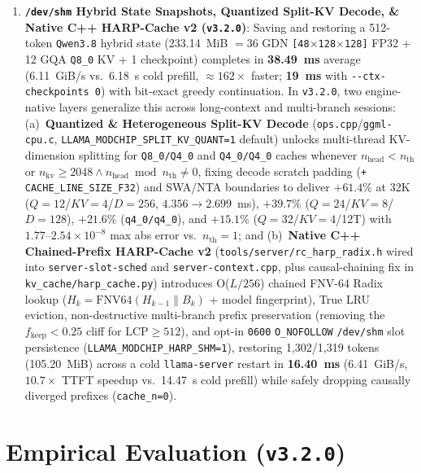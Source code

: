 \documentclass[10pt,twocolumn]{article}
\begin{document}
\begin{enumerate}
    \item \textbf{\texttt{/dev/shm} Hybrid State Snapshots, Quantized Split-KV Decode, \& Native C++ HARP-Cache v2 (\texttt{v3.2.0})}: Saving and restoring a 512-token \texttt{Qwen3.8} hybrid state (233.14~MiB $= 36$ GDN \texttt{[48$\times$128$\times$128]} FP32 + 12 GQA \texttt{Q8\_0} KV + 1 checkpoint) completes in \textbf{38.49~ms} average (6.11~GiB/s vs.\ 6.18~s cold prefill, ${\approx}162\times$ faster; \textbf{19~ms} with \texttt{{-}{-}ctx-checkpoints 0}) with bit-exact greedy continuation. In \texttt{v3.2.0}, two engine-native layers generalize this across long-context and multi-branch sessions: (a)~\textbf{Quantized \& Heterogeneous Split-KV Decode} (\texttt{ops.cpp}/\texttt{ggml-cpu.c}, \texttt{LLAMA\_MODCHIP\_SPLIT\_KV\_QUANT=1} default) unlocks multi-thread KV-dimension splitting for \texttt{Q8\_0/Q4\_0} and \texttt{Q4\_0/Q4\_0} caches whenever $n_{\text{head}} < n_{\text{th}}$ or $n_{\text{kv}} \ge 2048 \land n_{\text{head}} \bmod n_{\text{th}} \ne 0$, fixing decode scratch padding (\texttt{+ CACHE\_LINE\_SIZE\_F32}) and SWA/NTA boundaries to deliver \textbf{$+61.4\%$} at 32K ($Q{=}12$/$KV{=}4$/$D{=}256$, $4.356 \to 2.699$~ms), \textbf{$+39.7\%$} ($Q{=}24$/$KV{=}8$/$D{=}128$), \textbf{$+21.6\%$} (\texttt{q4\_0/q4\_0}), and \textbf{$+15.1\%$} ($Q{=}32$/$KV{=}4$/12T) with $1.77$--$2.54 \times 10^{-8}$ max abs error vs.\ $n_{\text{th}}{=}1$; and (b)~\textbf{Native C++ Chained-Prefix HARP-Cache v2} (\texttt{tools/server/rc\_harp\_radix.h} wired into \texttt{server-slot-sched} and \texttt{server-context.cpp}, plus causal-chaining fix in \texttt{kv\_cache/harp\_cache.py}) introduces O($L/256$) chained FNV-64 Radix lookup ($H_k = \text{FNV64}(H_{k-1} \parallel B_k)$ + model fingerprint), True LRU eviction, non-destructive multi-branch prefix preservation (removing the $f_{\text{keep}}<0.25$ cliff for $\text{LCP}\ge 512$), and opt-in \texttt{0600} \texttt{O\_NOFOLLOW} \texttt{/dev/shm} slot persistence (\texttt{LLAMA\_MODCHIP\_HARP\_SHM=1}), restoring 1,302/1,319 tokens (105.20~MiB) across a cold \texttt{llama-server} restart in \textbf{16.40~ms} (6.41~GiB/s, $10.7\times$ TTFT speedup vs.\ 14.47~s cold prefill) while safely dropping causally diverged prefixes (\texttt{cache\_n=0}).
\end{enumerate}

\section{Empirical Evaluation (\texttt{v3.2.0})}
\label{sec:eval}
\end{document}
